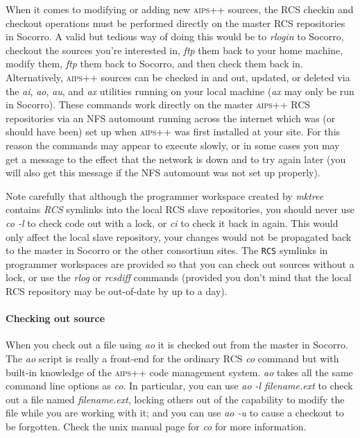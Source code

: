 When it comes to modifying or adding new \textsc{aips++} sources, the RCS checkin
and checkout operations must be performed directly on the master RCS
repositories in Socorro.  A valid but tedious way of doing this would
be to \textit{rlogin} to Socorro, checkout the sources you're interested
in, \textit{ftp} them back to your home machine, modify them, \textit{ftp} them back to
Socorro, and then check them back in.  Alternatively, \textsc{aips++}
sources can be checked in and out, updated, or deleted via the \textit{ai}, \textit{ao},
\textit{au}, and \textit{ax} utilities running on your local machine (\textit{ax} may only be
run in Socorro).  These commands work directly on the master
\textsc{aips++} RCS repositories via an NFS automount running across the internet
which was (or should have been) set up when \textsc{aips++} was first installed
at your site.  For this reason the commands may appear to execute slowly, or
in some cases you may get a message to the effect that the network is down and
to try again later (you will also get this message if the NFS automount was
not set up properly).

Note carefully that although the programmer workspace created by \textit{mktree}
contains \textsl{RCS} symlinks into the local RCS slave repositories, you should
never use \textit{co -l} to check code out with a lock, or \textit{ci} to check it back
in again.  This would only affect the local slave repository, your changes
would not be propagated back to the master in Socorro or the other
consortium sites.  The \texttt{RCS} symlinks in programmer workspaces are
provided so that you can check out sources without a lock, or use the \textit{rlog}
or \textit{rcsdiff} commands (provided you don't mind that the local RCS repository
may be out-of-date by up to a day).

\paragraph{Checking out source}
When you check out a file using \textit{ao} it is checked out from the master in
Socorro.  The \textit{ao} script is really a front-end for the ordinary
RCS \textit{co} command but with built-in knowledge of the \textsc{aips++} code
management system.  \textit{ao} takes all the same command line options as \textit{co}.
In particular, you can use \textit{ao -l filename.ext} to check out a file
named \textit{filename.ext}, locking others out of the capability to modify
the file while you are working with it; and you can use \textit{ao -u} to
cause a checkout to be forgotten.
Check the unix manual page for \textit{co} for more information.

